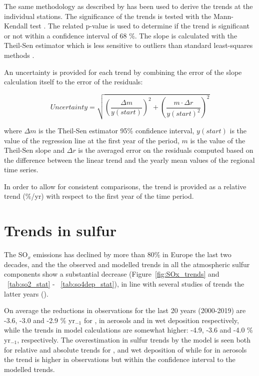 The same methodology as described by \cite{aas2019global, mortier2020} has been used to derive the trends at the individual stations. The significance of the trends is tested with the Mann-Kendall test \citep{hamed1998modified}. The related p-value is used to determine if the trend is significant or not within a confidence interval of 68 \%. The slope is calculated with the Theil-Sen estimator which is less sensitive to outliers than standard least-squares methods \citep{sen1968estimates}.

An uncertainty is provided for each trend by combining the error of the slope calculation itself to the error of the residuals:

\begin{equation}
 Uncertainty = \sqrt{{\left (\frac{\Delta m}{y(start)}\right )}^{2} + {\left ( \frac{m \cdot \Delta r}{y(start)^2}\right )}^{2} }
\end{equation}

where $\Delta m$ is the Theil-Sen estimator 95\% confidence interval, $y(start)$ is the value of the regression line at the first year of the period, $m$ is the value of the Theil-Sen slope and $\Delta r$ is the averaged error on the residuals computed based on the difference between the linear trend and the yearly mean values of the regional time series.

In order to allow for consistent comparisons, the trend is provided as a relative trend (\%/yr) with respect to the first year of the time period.



\section{\label{sec:Trends_sulfur}Trends in sulfur}

The SO$_x$ emissions has declined by more than 80\% in Europe the last two decades, and the the observed and modelled trends in all the atmospheric sulfur components show a substantial decrease (Figure~\ref{fig:SOx_trends} and ~\ref{tab:so2_stat} - ~\ref{tab:so4dep_stat}), in line with several studies of trends the latter years (\cite{aas2019global, Colette2012, Vivanco2018, Theobald2019, Colette2021, Banzhaf2015, torseth2012, Crippa2016}).

On average the reductions in observations for the last 20 years (2000-2019) are -3.6, -3.0 and -2.9  \% yr$_{-1}$ for \soii, \soiv in aerosols and in wet deposition respectively, while the trends in model calculations are somewhat higher: -4.9, -3.6 and -4.0 \% yr$_{-1}$, respectively. The overestimation in sulfur trends by the model is seen both for relative and absolute trends for \soii, and wet deposition of \soiv while for \soiv in aerosols the trend is higher in observations but within the confidence interval to the modelled trends. 




